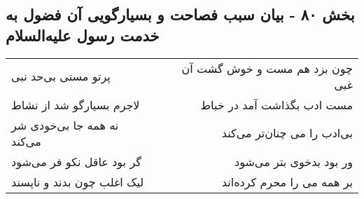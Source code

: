 \begin{center}
\section*{بخش ۸۰ - بیان سبب فصاحت و بسیارگویی آن فضول به خدمت رسول علیه‌السلام}
\label{sec:sh080}
\begin{longtable}{l p{0.5cm} r}
پرتو مستی بی‌حد نبی
&&
چون بزد هم مست و خوش گشت آن غبی
\\
لاجرم بسیارگو شد از نشاط
&&
مست ادب بگذاشت آمد در خباط
\\
نه همه جا بی‌خودی شر می‌کند
&&
بی‌ادب را می چنان‌تر می‌کند
\\
گر بود عاقل نکو فر می‌شود
&&
ور بود بدخوی بتر می‌شود
\\
لیک اغلب چون بدند و ناپسند
&&
بر همه می را محرم کرده‌اند
\\
\end{longtable}
\end{center}
